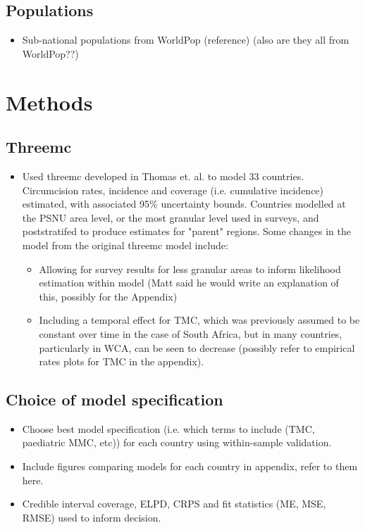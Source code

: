 \documentclass{article}
\begin{document}
\subsection*{Populations}
\label{sec:org8e38f82}

\begin{itemize}
\item Sub-national populations from WorldPop (reference) (also are they all from WorldPop??)
\end{itemize}

\section*{Methods}
\label{sec:org8e2d064}

\subsection*{Threemc}
\label{sec:orgc2fd8b2}
\begin{itemize}
\item Used threemc developed in Thomas et. al. to model 33 countries. Circumcision rates, incidence and coverage (i.e. cumulative incidence) estimated, with associated 95\% uncertainty bounds.
Countries modelled at the PSNU area level, or the most granular level used in surveys, and poststratifed to produce estimates for "parent" regions. 
Some changes in the model from the original threemc model include:
\begin{itemize}
\item Allowing for survey results for less granular areas to inform likelihood estimation within model (Matt said he would write an explanation of this, possibly for the Appendix)
\item Including a temporal effect for TMC, which was previously assumed to be constant over time in
the case of South Africa, but in many countries, particularly in WCA, can be seen to decrease
(possibly refer to empirical rates plots for TMC in the appendix).
\end{itemize}
\end{itemize}

\subsection*{Choice of model specification}
\label{sec:org85fb5a7}

\begin{itemize}
\item Choose best model specification (i.e. which terms to include (TMC, paediatric MMC, etc)) for
each country using within-sample validation.
\item Include figures comparing models for each country in appendix, refer to them here.
\item Credible interval coverage, ELPD, CRPS and fit statistics (ME, MSE, RMSE) used to inform
decision.
\end{itemize}
\end{document}
